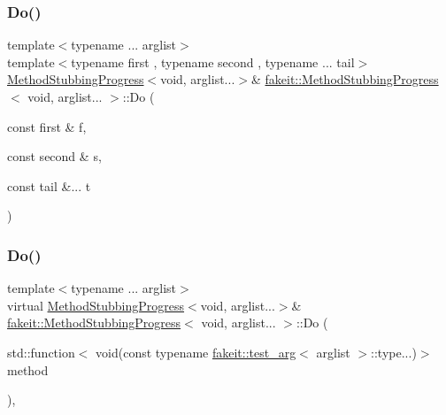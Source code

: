 \mbox{\label{structfakeit_1_1MethodStubbingProgress_3_01void_00_01arglist_8_8_8_01_4_a45b048006587b626f8220aa4b196de2a}} 
\subsubsection{\texorpdfstring{Do()}{Do()}\hspace{0.1cm}{\footnotesize\ttfamily [22/27]}}
{\footnotesize\ttfamily template$<$typename ... arglist$>$ \\
template$<$typename first , typename second , typename ... tail$>$ \\
\mbox{\hyperlink{structfakeit_1_1MethodStubbingProgress}{Method\+Stubbing\+Progress}}$<$void, arglist...$>$\& \mbox{\hyperlink{structfakeit_1_1MethodStubbingProgress}{fakeit\+::\+Method\+Stubbing\+Progress}}$<$ void, arglist... $>$\+::Do (\begin{DoxyParamCaption}\item[{const first \&}]{f,  }\item[{const second \&}]{s,  }\item[{const tail \&...}]{t }\end{DoxyParamCaption})\hspace{0.3cm}{\ttfamily [inline]}}

\mbox{\label{structfakeit_1_1MethodStubbingProgress_3_01void_00_01arglist_8_8_8_01_4_ae41031c8833fad09c16cbbc89569918b}} 
\subsubsection{\texorpdfstring{Do()}{Do()}\hspace{0.1cm}{\footnotesize\ttfamily [23/27]}}
{\footnotesize\ttfamily template$<$typename ... arglist$>$ \\
virtual \mbox{\hyperlink{structfakeit_1_1MethodStubbingProgress}{Method\+Stubbing\+Progress}}$<$void, arglist...$>$\& \mbox{\hyperlink{structfakeit_1_1MethodStubbingProgress}{fakeit\+::\+Method\+Stubbing\+Progress}}$<$ void, arglist... $>$\+::Do (\begin{DoxyParamCaption}\item[{std\+::function$<$ void(const typename \mbox{\hyperlink{structfakeit_1_1test__arg}{fakeit\+::test\+\_\+arg}}$<$ arglist $>$\+::type...)$>$}]{method }\end{DoxyParamCaption})\hspace{0.3cm}{\ttfamily [inline]}, {\ttfamily [virtual]}}

